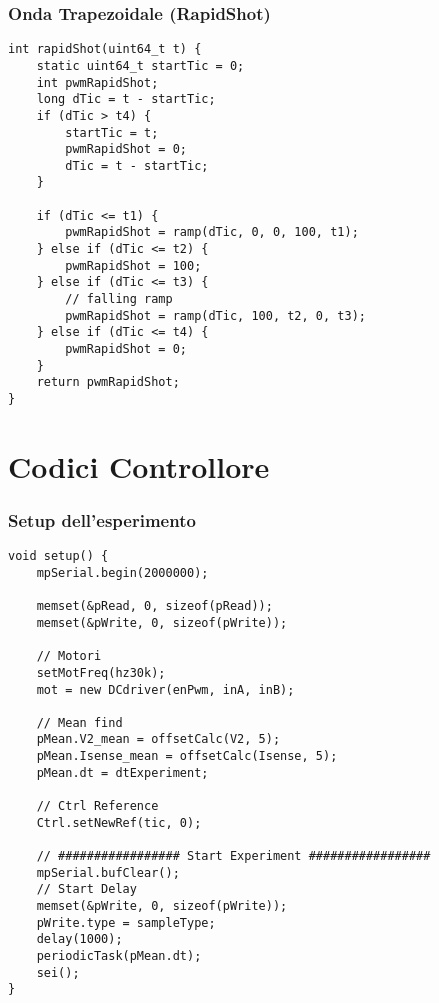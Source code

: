 \subsubsection{Onda Trapezoidale (RapidShot)}
\begin{lstlisting}[style=cppStyle,caption={Onda Trapezoidale Periodica (RapidShot)},label=lst:ondaTrapezoidale] 
int rapidShot(uint64_t t) {
	static uint64_t startTic = 0;
	int pwmRapidShot;
	long dTic = t - startTic;
	if (dTic > t4) {
		startTic = t;
		pwmRapidShot = 0;
		dTic = t - startTic;
	}
	
	if (dTic <= t1) {
		pwmRapidShot = ramp(dTic, 0, 0, 100, t1);
	} else if (dTic <= t2) {
		pwmRapidShot = 100;
	} else if (dTic <= t3) {
		// falling ramp
		pwmRapidShot = ramp(dTic, 100, t2, 0, t3);
	} else if (dTic <= t4) {
		pwmRapidShot = 0;
	}	
	return pwmRapidShot;
}
\end{lstlisting}

\newpage

\section{Codici Controllore}

\subsubsection{Setup dell'esperimento}
\begin{lstlisting}[style=cppStyle,caption={Loop di Controllo},label=lst:controlSetup] 
void setup() {
	mpSerial.begin(2000000);
	
	memset(&pRead, 0, sizeof(pRead));
	memset(&pWrite, 0, sizeof(pWrite));
	
	// Motori
	setMotFreq(hz30k);
	mot = new DCdriver(enPwm, inA, inB);
	
	// Mean find
	pMean.V2_mean = offsetCalc(V2, 5);
	pMean.Isense_mean = offsetCalc(Isense, 5);
	pMean.dt = dtExperiment;
	
	// Ctrl Reference
	Ctrl.setNewRef(tic, 0);
	
	// ################# Start Experiment #################
	mpSerial.bufClear();
	// Start Delay
	memset(&pWrite, 0, sizeof(pWrite));
	pWrite.type = sampleType;
	delay(1000);
	periodicTask(pMean.dt);
	sei();
}
\end{lstlisting}

